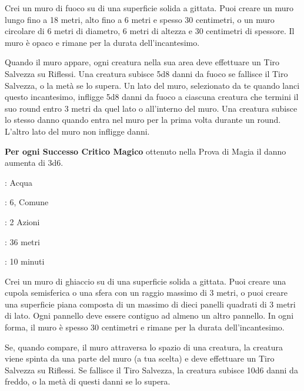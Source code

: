 \begin{multicols}{2}
Crei un muro di fuoco su di una superficie solida a gittata. Puoi creare un muro lungo fino a 18 metri, alto fino a 6 metri e spesso 30 centimetri, o un muro circolare di 6 metri di diametro, 6 metri di altezza e 30 centimetri di spessore. Il muro è opaco e rimane per la durata dell'incantesimo.

Quando il muro appare, ogni creatura nella sua area deve effettuare un Tiro Salvezza su Riflessi. Una creatura subisce 5d8 danni da fuoco se fallisce il Tiro Salvezza, o la metà se lo supera. Un lato del muro, selezionato da te quando lanci questo incantesimo, infligge 5d8 danni da fuoco a ciascuna creatura che termini il suo round entro 3 metri da quel lato o all'interno del muro. Una creatura subisce lo stesso danno quando entra nel muro per la prima volta durante un round. L'altro lato del muro non infligge danni.

\textbf{Per ogni Successo Critico Magico} ottenuto nella Prova di Magia il danno aumenta di 3d6.

\noindent\colorbox{OBSSgold!10}{
\begin{minipage}{0.95\linewidth}
\begin{description}[noitemsep, topsep=0pt, parsep=0pt, partopsep=0pt, leftmargin=0cm, labelwidth=1.3cm]
	\item[\textbf{Lista}]: Acqua
	\item[\textbf{Livello}]: 6, Comune
	\item[\textbf{Lancio}]: 2 Azioni
	\item[\textbf{Gittata}]: 36 metri
	\item[\textbf{Durata}]: 10 minuti
\end{description}
\end{minipage}}\smallskip

Crei un muro di ghiaccio su di una superficie solida a gittata. Puoi creare una cupola semisferica o una sfera con un raggio massimo di 3 metri, o puoi creare una superficie piana composta di un massimo di dieci panelli quadrati di 3 metri di lato. Ogni pannello deve essere contiguo ad almeno un altro pannello. In ogni forma, il muro è spesso 30 centimetri e rimane per la durata dell'incantesimo.

Se, quando compare, il muro attraversa lo spazio di una creatura, la creatura viene spinta da una parte del muro (a tua scelta) e deve effettuare un Tiro Salvezza su Riflessi. Se fallisce il Tiro Salvezza, la creatura subisce 10d6 danni da freddo, o la metà di questi danni se lo supera.


\end{multicols}
